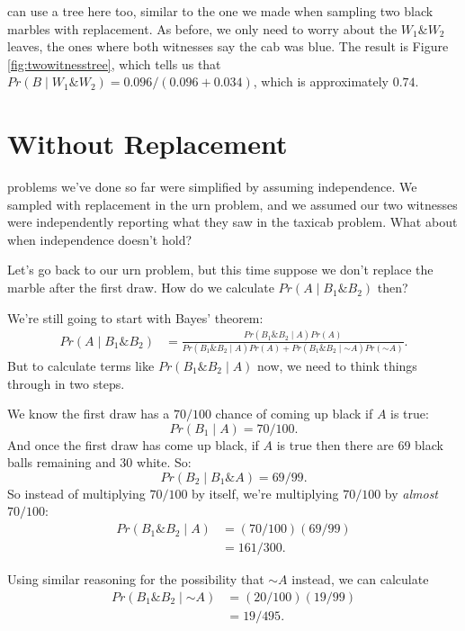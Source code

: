 \documentclass[justified]{tufte-book}
\newcommand{\given}{\mid}
\renewcommand{\neg}{\mathbin{\sim}}
\renewcommand{\wedge}{\mathbin{\&}}
\newcommand{\p}{Pr}
\theoremstyle{definition}
\theoremstyle{definition}
\theoremstyle{definition}
\theoremstyle{remark}
\begin{document}
 can use a tree here too, similar to the one we made when sampling two black marbles with replacement. As before, we only need to worry about the \(W_1 \wedge W_2\) leaves, the ones where both witnesses say the cab was blue. The result is Figure \ref{fig:twowitnesstree}, which tells us that \(\p(B \given W_1 \wedge W_2) = 0.096 / (0.096 + 0.034)\), which is approximately \(0.74\).

\hypertarget{without-replacement}{%
\section{Without Replacement}\label{without-replacement}}

 problems we've done so far were simplified by assuming independence. We sampled with replacement in the urn problem, and we assumed our two witnesses were independently reporting what they saw in the taxicab problem. What about when independence doesn't hold?

Let's go back to our urn problem, but this time suppose we don't replace the marble after the first draw. How do we calculate \(\p(A \given B_1 \wedge B_2)\) then?

We're still going to start with Bayes' theorem:
\[
  \begin{aligned}
    \p(A \given B_1 \wedge B_2) &= \frac{\p(B_1 \wedge B_2 \given A)\p(A)}{\p(B_1 \wedge B_2 \given A) \p(A) + \p(B_1 \wedge B_2 \given \neg A) \p(\neg A)}.
  \end{aligned}
\]
But to calculate terms like \(\p(B_1 \wedge B_2 \given A)\) now, we need to think things through in two steps.

We know the first draw has a \(70/100\) chance of coming up black if \(A\) is true:
\[ \p(B_1 \given A) = 70/100. \]
And once the first draw has come up black, if \(A\) is true then there are 69 black balls remaining and 30 white. So:
\[ \p(B_2 \given B_1 \wedge A) = 69/99. \]
So instead of multiplying \(70/100\) by itself, we're multiplying \(70/100\) by \emph{almost} \(70/100\):
\[
  \begin{aligned}
    \p(B_1 \wedge B_2 \given A) &= (70/100)(69/99)\\
       &= 161/300.
  \end{aligned}
\]

Using similar reasoning for the possibility that \(\neg A\) instead, we can calculate
\[
  \begin{aligned}
    \p(B_1 \wedge B_2 \given \neg A) &= (20/100)(19/99)\\
       &= 19/495.
  \end{aligned}
\]
\end{document}
